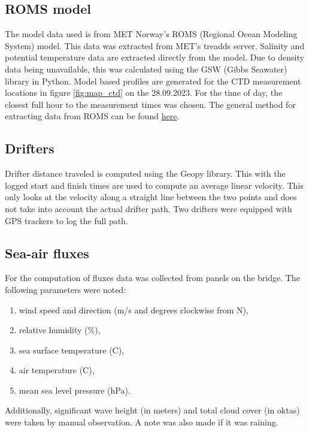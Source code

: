 \documentclass[a4paper,10pt,english]{article}
\begin{document}
\subsection{ROMS model}
The model data used is from MET Norway's ROMS (Regional Ocean Modeling System) model. This data was extracted from MET's treadds server.
Salinity and potential temperature data are extracted directly from the model. Due to density data being unavailable, this was calculated using the GSW (Gibbs Seawater) library in Python. Model based profiles are generated for the CTD measurement locations in figure \ref*{fig:map_ctd} on the 28.09.2023. For the time of day, the closest full hour to the measurement times was chosen. The general method for extracting data from ROMS can be found \href{https://github.com/kaihc/GEO2320/blob/main/cruise/extract_salt_temp_roms_from_metno_thredds.ipynb}{here}.


\subsection{Drifters}
Drifter distance traveled is computed using the Geopy library. This with the logged start and finish times are used to compute an average linear velocity. This only looks at the velocity along a straight line between the two points and does not take into account the actual drifter path. Two drifters were equipped with GPS trackers to log the full path.

\subsection{Sea-air fluxes}
For the computation of fluxes data was collected from panels on the bridge. The following parameters were noted:
\begin{enumerate}[label=--, itemsep=0pt,parsep=0pt]
        \item wind speed and direction (m/s and degrees clockwise from N),
        \item relative humidity (\%),
        \item sea surface temperature (C),
        \item air temperature (C),
        \item mean sea level pressure (hPa).
\end{enumerate}

Additionally, significant wave height (in meters) and total cloud cover (in oktas) were taken by manual observation. A note was also made if it was raining.
\end{document}
